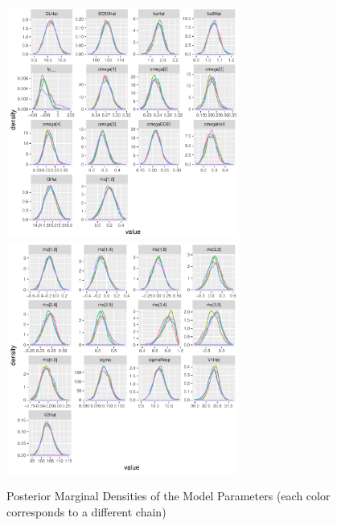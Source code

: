 \documentclass[11pt]{amsart}
\begin{document}
\begin{figure}[htbp]
\includegraphics[width=3.0in,trim=0in 0in 0 0in]{graphics/effCptModelTorsten/effCptModelTorstenPlots006.pdf}
\includegraphics[width=3.0in,trim=0in 0in 0 0in]{graphics/effCptModelTorsten/effCptModelTorstenPlots007.pdf}
\caption{{Posterior Marginal Densities of the Model Parameters (each color corresponds to a different chain)}}
\label{MCMC1}
\end{figure}
\end{document}

